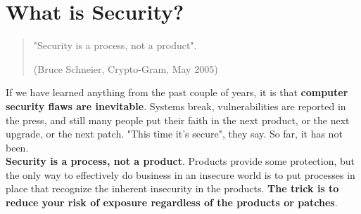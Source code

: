  {}




\section{What is Security?}
\begin{quote}
  "Security is a process, not a product".
  \begin{flushright}
    (Bruce Schneier, Crypto-Gram, May 2005)
  \end{flushright}
\end{quote}


If we have learned anything from the past couple of years, it is that \textbf{computer security flaws are inevitable}.
Systems break, vulnerabilities are reported in the press, and still many people put their faith in the next product, or the next upgrade, or the next patch. "This time it's secure", they say. So far, it has not been.\\
\textbf{Security is a process, not a product}. Products provide some protection, but the only way to effectively do business in an insecure world is to put processes in place that recognize the inherent insecurity in the products.
\textbf{The trick is to reduce your risk of exposure regardless of the products or patches}.

